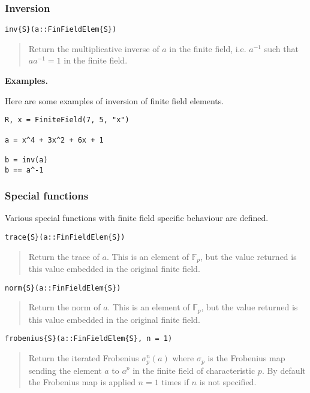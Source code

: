 \documentclass[a4paper,10pt]{article}
\newcommand{\F}{\mathbb{F}}
\newcommand{\desc}[1]{\vspace{-3mm}\begin{quote}#1\end{quote}}
\begin{document}
{{{\subsubsection{Inversion}

\begin{lstlisting}
inv{S}(a::FinFieldElem{S})
\end{lstlisting}

\desc{Return the multiplicative inverse of $a$ in the finite field, i.e. 
$a^{-1}$ such that $aa^{-1} = 1$ in the finite field.}

\textbf{Examples.}

Here are some examples of inversion of finite field elements.

\begin{lstlisting}
R, x = FiniteField(7, 5, "x")

a = x^4 + 3x^2 + 6x + 1

b = inv(a)
b == a^-1
\end{lstlisting}

\subsubsection{Special functions}

Various special functions with finite field specific behaviour are
defined.

\begin{lstlisting}
trace{S}(a::FinFieldElem{S})
\end{lstlisting}

\desc{Return the trace of $a$. This is an element of $\F_p$, but the value
returned is this value embedded in the original finite field.}

\begin{lstlisting}
norm{S}(a::FinFieldElem{S})
\end{lstlisting}

\desc{Return the norm of $a$. This is an element of $\F_p$, but the value
returned is this value embedded in the original finite field.}

\begin{lstlisting}
frobenius{S}(a::FinFieldElem{S}, n = 1)
\end{lstlisting}

\desc{Return the iterated Frobenius $\sigma_p^n(a)$ where $\sigma_p$ is the 
Frobenius map sending the element $a$ to $a^p$ in the finite field of 
characteristic $p$. By default the Frobenius map is applied $n = 1$ times if
$n$ is not specified.}

}}}
\end{document}
